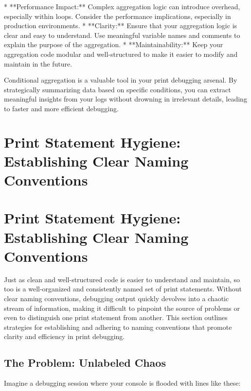 \documentclass{article}
\begin{document}
{{{*   **Performance Impact:** Complex aggregation logic can introduce overhead, especially within loops. Consider the performance implications, especially in production environments.
*   **Clarity:** Ensure that your aggregation logic is clear and easy to understand. Use meaningful variable names and comments to explain the purpose of the aggregation.
*   **Maintainability:** Keep your aggregation code modular and well-structured to make it easier to modify and maintain in the future.

Conditional aggregation is a valuable tool in your print debugging arsenal. By strategically summarizing data based on specific conditions, you can extract meaningful insights from your logs without drowning in irrelevant details, leading to faster and more efficient debugging.

\newpage

\section*{Print Statement Hygiene: Establishing Clear Naming Conventions} %
\label{chapter-4-9-Print_Statement_Hygiene__Establishing_Cl}

\section*{Print Statement Hygiene: Establishing Clear Naming Conventions}

Just as clean and well-structured code is easier to understand and maintain, so too is a well-organized and consistently named set of print statements.  Without clear naming conventions, debugging output quickly devolves into a chaotic stream of information, making it difficult to pinpoint the source of problems or even to distinguish one print statement from another.  This section outlines strategies for establishing and adhering to naming conventions that promote clarity and efficiency in print debugging.

\subsection*{The Problem: Unlabeled Chaos}

Imagine a debugging session where your console is flooded with lines like these:

}}}
\end{document}
